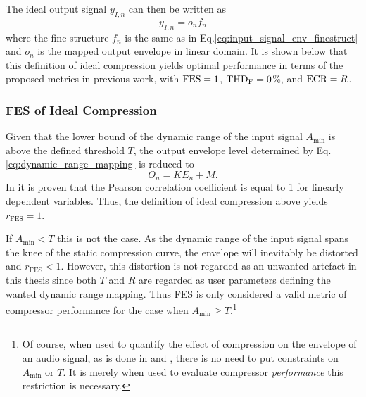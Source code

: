 \documentclass[../main2.tex]{subfiles}
\begin{document}
The ideal output signal $y_{I,n}$ can then be written as
\begin{equation}\label{eq:ideal_output}
y_{I,n} = o_n f_n
\end{equation}
where the fine-structure $f_n$ is the same as in Eq.\eqref{eq:input_signal_env_finestruct} and $o_n$ is the mapped output envelope in linear domain. It is shown below that this definition of ideal compression yields optimal performance in terms of the proposed metrics in previous work, with $\text{FES} = 1$, $\text{THD}_\text{F}=0$\%, and $\text{ECR}=R$.
\subsubsection{FES of Ideal Compression}
Given that the lower bound of the dynamic range of the input signal $A_\text{min}$ is above the defined threshold $T$, the output envelope level determined by Eq.\eqref{eq:dynamic_range_mapping} is reduced to
\begin{equation}
O_n = K E_n + M.
\end{equation}
In \cite{XXXX} it is proven that the Pearson correlation coefficient is equal to 1 for linearly dependent variables. Thus, the definition of ideal compression above yields $r_\text{FES} = 1$.

If $A_\text{min} < T$ this is not the case. As the dynamic range of the input signal spans the knee of the static compression curve, the envelope will inevitably be distorted and $r_\text{FES} < 1$. However, this distortion is not regarded as an unwanted artefact in this thesis since both $T$ and $R$ are regarded as user parameters defining the wanted dynamic range mapping. Thus FES is only considered a valid metric of compressor performance for the case when $A_\text{min} \geq T$.\footnote{Of course, when used to quantify the effect of compression on the envelope of an audio signal, as is done in \cite{XXXX} and \cite{XXXX}, there is no need to put constraints on $A_\text{min}$ or $T$. It is merely when used to evaluate compressor \emph{performance} this restriction is necessary.}

\end{document}

